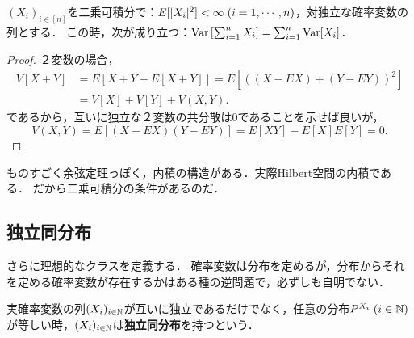 \documentclass[uplatex,dvipdfmx]{jsreport}
\begin{document}
\begin{corollary}[分散が和を保つ条件]\label{cor-linearity-of-Var-on-independent-variables}
    $(X_i)_{i\in[n]}$を二乗可積分で：$E[\lvert X_i\rvert^2]<\infty\;(i=1,\cdots,n)$，対独立な確率変数の列とする．
    この時，次が成り立つ：$\mathrm{Var}\left[\sum^n_{i=1}X_i\right]=\sum^n_{i=1}\mathrm{Var}[X_i]$．
\end{corollary}
\begin{proof}
    ２変数の場合，
    \begin{align*}
        V[X+Y]&=E[X+Y-E[X+Y]]=E[((X-EX)+(Y-EY))^2]\\
        &=V[X]+V[Y]+V(X,Y).
    \end{align*}
    であるから，互いに独立な２変数の共分散は$0$であることを示せば良いが，
    \[V(X,Y)=E[(X-EX)(Y-EY)]=E[XY]-E[X]E[Y]=0.\]
\end{proof}
\begin{remarks}
    ものすごく余弦定理っぽく，内積の構造がある．実際Hilbert空間の内積である．
    だから二乗可積分の条件があるのだ．
\end{remarks}

\subsection{独立同分布}

\begin{tcolorbox}[colframe=ForestGreen, colback=ForestGreen!10!white,breakable,colbacktitle=ForestGreen!40!white,coltitle=black,fonttitle=\bfseries\sffamily,
title=]
    さらに理想的なクラスを定義する．
    確率変数は分布を定めるが，分布からそれを定める確率変数が存在するかはある種の逆問題で，必ずしも自明でない．
\end{tcolorbox}

\begin{definition}
    実確率変数の列$(X_i)_{i\in\mathbb{N}}$が互いに独立であるだけでなく，任意の分布$P^{X_i}\;(i\in\mathbb{N})$が等しい時，$(X_i)_{i\in\mathbb{N}}$は\textbf{独立同分布}を持つという．
\end{definition}
\end{document}
